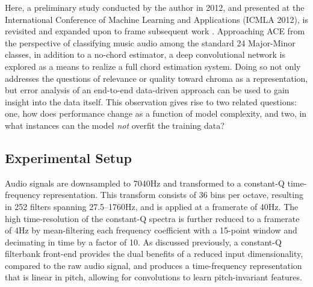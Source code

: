 Here, a preliminary study conducted by the author in 2012, and presented at the International Conference of Machine Learning and Applications (ICMLA 2012), is revisited and expanded upon to frame subsequent work \cite{Humphrey2012Rethinking}.
Approaching ACE from the perspective of classifying music audio among the standard 24 Major-Minor classes, in addition to a no-chord estimator, a deep convolutional network is explored as a means to realize a full chord estimation system.
Doing so not only addresses the questions of relevance or quality toward chroma as a representation, but error analysis of an end-to-end data-driven approach can be used to gain insight into the data itself.
This observation gives rise to two related questions: one, how does performance change as a function of model complexity, and two, in what instances can the model \emph{not} overfit the training data?


\subsection{Experimental Setup}
\label{subsec:experimental_setup}

Audio signals are downsampled to 7040Hz and transformed to a constant-Q time-frequency representation.
This transform consists of 36 bins per octave, resulting in 252 filters spanning 27.5--1760Hz, and is applied at a framerate of 40Hz.
The high time-resolution of the constant-Q spectra is further reduced to a framerate of 4Hz by mean-filtering each frequency coefficient with a 15-point window and decimating in time by a factor of 10.
As discussed previously, a constant-Q filterbank front-end provides the dual benefits of a reduced input dimensionality, compared to the raw audio signal, and produces a time-frequency representation that is linear in pitch, allowing for convolutions to learn pitch-invariant features.

